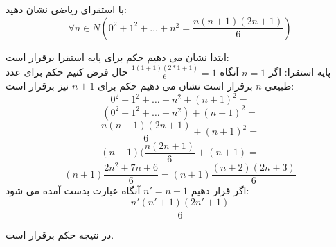 
با استقرای ریاضی نشان دهید:
\[\forall n\in N(0^{2}+ 1^{2}+ \dots + n^{2} = \frac{n(n+1)(2n+1)}{6})\]
\begin{ans}
ابتدا نشان می دهیم حکم برای پایه استقرا برقرار است:
\\
پایه استقرا: اگر
$n = 1$
آنگاه 
$\frac{1(1+1)(2*1+1)}{6} = 1$
حال فرض کنیم حکم برای عدد طبیعی
$n$
برقرار است نشان می دهیم حکم برای 
$n+1$
نیز برقرار است:
\[0^{2}+1^{2}+ \dots + n^{2} + (n+1)^{2} =\]
\[(0^{2}+1^{2}+ \dots + n^{2}) +(n+1)^{2} =\]
\[\frac{n(n+1)(2n+1)}{6} + (n+1)^{2} = \]
\[(n+1)(\frac{n(2n+1)}{6} + (n+1) = \]
\[(n+1)\frac{2n^{2}+7n+6}{6} = (n+1)\frac{(n+2)(2n+3)}{6}\]
اگر قرار دهیم
$n' = n +1$
آنگاه عبارت بدست آمده می شود:
\[\frac{n'(n'+1)(2n'+1)}{6}\]

در نتیجه حکم برقرار است.
\end{ans}
